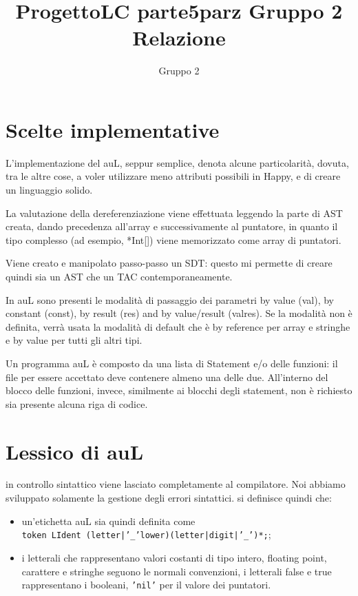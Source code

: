 \documentclass{article}
\title{ProgettoLC parte5parz Gruppo 2 Relazione}
\author{Gruppo 2 }
\begin{document}

\setcounter{page}{1}

\section{Scelte implementative}
L'implementazione del auL, seppur semplice, denota alcune particolarità, dovuta, tra le altre cose, a voler utilizzare
meno attributi possibili in Happy, e di creare un linguaggio solido.

La valutazione della dereferenziazione viene effettuata leggendo la parte di AST creata, dando precedenza all'array
e successivamente al puntatore, in quanto il tipo complesso (ad esempio, *Int[]) viene memorizzato come array di
puntatori.

Viene creato e manipolato passo-passo un SDT: questo mi permette di creare quindi sia un AST che un TAC contemporaneamente.

In auL sono presenti le modalità di passaggio dei parametri by value (val), by constant (const), by 
result (res) and by value/result (valres). Se la modalità non è definita, verrà usata la modalità di default che è by 
reference per array e stringhe e by value per tutti gli altri tipi.

Un programma auL è composto da una lista di Statement e/o delle funzioni: il file per essere accettato deve contenere
almeno una delle due. All'interno del blocco delle funzioni, invece, similmente ai blocchi degli statement, non è richiesto
sia presente alcuna riga di codice.

\section{Lessico di auL}
in controllo sintattico viene lasciato completamente al compilatore. Noi abbiamo sviluppato solamente la gestione
degli errori sintattici. si definisce quindi che:
\begin{itemize}
	\item un'etichetta auL sia quindi definita come\\
		\texttt{token LIdent (letter|'\_'lower)(letter|digit|'\_')*;};
	
	\item i letterali che rappresentano valori costanti di tipo intero, floating point, carattere e stringhe 
	seguono le normali convenzioni, i letterali false e true rappresentano i booleani, \texttt{'nil'} per il valore
	dei puntatori.
\end{itemize}
\end{document}
